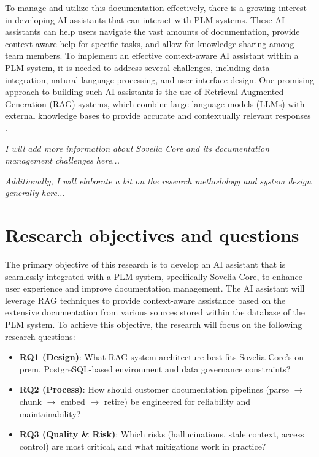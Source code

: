 To manage and utilize this documentation effectively, there is a growing interest in developing AI assistants that can interact with PLM systems. These AI assistants can help users navigate the vast amounts of documentation, provide context-aware help for specific tasks, and allow for knowledge sharing among team members. To implement an effective context-aware AI assistant within a PLM system, it is needed to address several challenges, including data integration, natural language processing, and user interface design. One promising approach to building such AI assistants is the use of Retrieval-Augmented Generation (RAG) systems, which combine large language models (LLMs) with external knowledge bases to provide accurate and contextually relevant responses \parencite{lewis_retrieval-augmented_2021}.


\textit{I will add more information about Sovelia Core and its documentation management challenges here...}

\textit{Additionally, I will elaborate a bit on the research methodology and system design generally here...}

\section{Research objectives and questions}
\label{sec:research-objectives-and-questions}

The primary objective of this research is to develop an AI assistant that is seamlessly integrated with a PLM system, specifically Sovelia Core, to enhance user experience and improve documentation management. The AI assistant will leverage RAG techniques to provide context-aware assistance based on the extensive documentation from various sources stored within the database of the PLM system. To achieve this objective, the research will focus on the following research questions:

\begin{itemize}
	\item \textbf{RQ1 (Design)}: What RAG system architecture best fits Sovelia Core's on-prem, PostgreSQL-based environment and data governance constraints?
	\item \textbf{RQ2 (Process)}: How should customer documentation pipelines (parse $ \rightarrow $ chunk $ \rightarrow $ embed $ \rightarrow $ retire) be engineered for reliability and maintainability?
	\item \textbf{RQ3 (Quality \& Risk)}: Which risks (hallucinations, stale context, access control) are most critical, and what mitigations work in practice?
\end{itemize}

